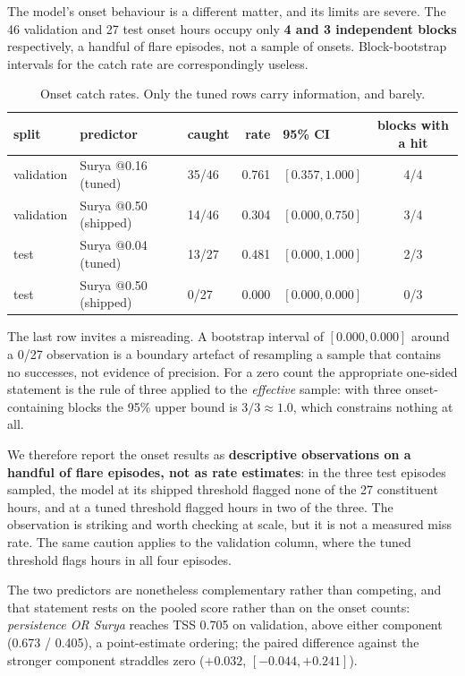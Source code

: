 \documentclass[11pt]{article}
\begin{document}
The model's onset behaviour is a different matter, and its limits are severe. The 46 validation and 27 test onset hours occupy only \textbf{4 and 3
independent blocks} respectively, a handful of flare episodes, not a sample of
onsets. Block-bootstrap intervals for the catch rate are correspondingly useless.

\begin{table}[htbp]
\centering
\caption{Onset catch rates. Only the tuned rows carry information, and barely.}
\begin{tabular}{lllrlc}
\toprule
split & predictor & caught & rate & 95\% CI & blocks with a hit \\
\midrule
validation & Surya @0.16 (tuned) & 35/46 & 0.761 & $[0.357, 1.000]$ & 4/4 \\
validation & Surya @0.50 (shipped) & 14/46 & 0.304 & $[0.000, 0.750]$ & 3/4 \\
test & Surya @0.04 (tuned) & 13/27 & 0.481 & $[0.000, 1.000]$ & 2/3 \\
test & Surya @0.50 (shipped) & 0/27 & 0.000 & $[0.000, 0.000]$ & 0/3 \\
\bottomrule
\end{tabular}
\end{table}

The last row invites a misreading. A bootstrap interval of $[0.000, 0.000]$ around a 0/27 observation is a
boundary artefact of resampling a sample that contains no successes, not evidence
of precision. For a zero count the appropriate one-sided statement is the rule of
three applied to the \emph{effective} sample: with three onset-containing blocks
the 95\% upper bound is $3/3 \approx 1.0$, which constrains nothing at all.

We therefore report the onset results as \textbf{descriptive observations on a
handful of flare episodes, not as rate estimates}: in the three test episodes
sampled, the model at its shipped threshold flagged none of the 27 constituent
hours, and at a tuned threshold flagged hours in two of the three. The observation is striking and worth
checking at scale, but it is not a measured miss rate. The same caution applies to the
validation column, where the tuned threshold flags hours in all four episodes.

The two predictors are nonetheless complementary rather than competing, and that
statement rests on the pooled score rather than on the onset counts:
\emph{persistence OR Surya} reaches TSS 0.705 on validation, above either
component (0.673 / 0.405), a point-estimate ordering; the paired difference
against the stronger component straddles zero ($+0.032$, $[-0.044, +0.241]$).
\end{document}
